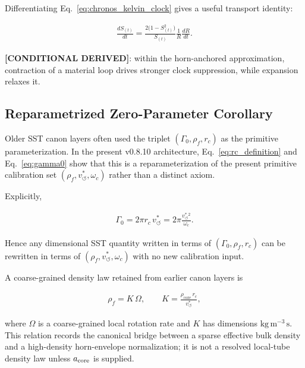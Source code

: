 \documentclass[11pt]{article}
\theoremstyle{definition}
\theoremstyle{plain}
\theoremstyle{remark}
\newcommand{\rhoF}{{\rho_{\!f}}}
\newcommand{\rhocore}{\rho_{\mathrm{core}}}
\newcommand{\rc}{{r_c}}
\newcommand{\vchar}{v_{\!\boldsymbol{\circlearrowleft}}^{\ast}}
\begin{document}
        Differentiating Eq.~\eqref{eq:chronos_kelvin_clock} gives a useful transport identity:

        \begin{align}
            \frac{dS_{(t)}}{dt}
            =
            \frac{2\bigl(1-S_{(t)}^2\bigr)}{S_{(t)}}
            \frac{1}{R}\frac{dR}{dt}.
            \label{eq:clock_radius_transport}
        \end{align}

        \textbf{[CONDITIONAL DERIVED]}: within the horn-anchored approximation, contraction of a material loop drives stronger clock suppression, while expansion relaxes it.

    \subsection{Reparametrized Zero-Parameter Corollary}
        \label{subsec:zero_parameter_corollary}

        Older SST canon layers often used the triplet $(\Gamma_0,\rhoF,\rc)$ as the primitive parameterization. In the present v0.8.10 architecture, Eq.~\eqref{eq:rc_definition} and Eq.~\eqref{eq:gamma0} show that this is a reparameterization of the present primitive calibration set $(\rhoF,\vchar,\omega_c)$ rather than a distinct axiom.

        Explicitly,

        \begin{align}
            \Gamma_0 = 2\pi \rc \, \vchar
            = 2\pi \frac{\vchar{}^2}{\omega_c}.
            \label{eq:gamma0_reparam}
        \end{align}

        Hence any dimensional SST quantity written in terms of $(\Gamma_0,\rhoF,\rc)$ can be rewritten in terms of $(\rhoF,\vchar,\omega_c)$ with no new calibration input.

        A coarse-grained density law retained from earlier canon layers is

        \begin{align}
            \rhoF = K\,\Omega,
            \qquad
            K = \frac{\rhocore \, \rc}{\vchar},
            \label{eq:coarse_grain_density}
        \end{align}

        where $\Omega$ is a coarse-grained local rotation rate and $K$ has dimensions $\mathrm{kg\,m^{-3}\,s}$. This relation records the canonical bridge between a sparse effective bulk density and a high-density horn-envelope normalization; it is not a resolved local-tube density law unless $a_{\rm core}$ is supplied.
\end{document}
